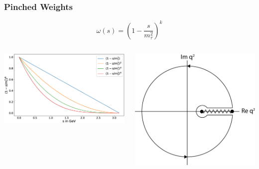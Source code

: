 \documentclass[fleqn]{beamer}
\begin{document}
\begin{frame}
  \frametitle{Pinched Weights}
  \begin{ceqn}
    \begin{equation}
      \omega(s) = \left( 1 - \frac{s}{m_\tau^2} \right)^k
    \end{equation}
  \end{ceqn}
  \vfill
  \begin{columns}
    \begin{column}{.7\textwidth}
      \includegraphics[width=\textwidth]{./images/monomialWeightGraphs.eps}
    \end{column}
    \begin{column}{.3\textwidth}
      \includegraphics[width=\textwidth]{./images/complexCountour.eps}
    \end{column}
  \end{columns}
\end{frame}
\end{document}
